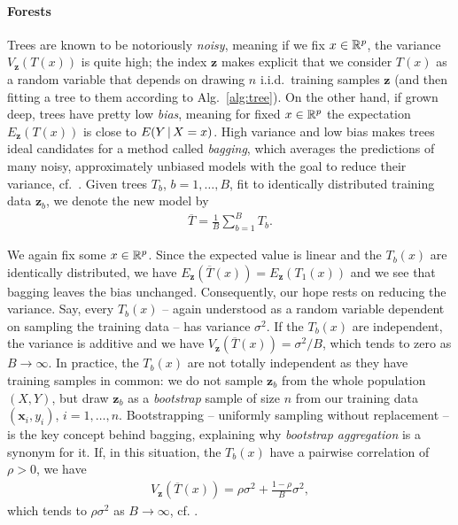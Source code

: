 \paragraph{Forests}
Trees are known to be notoriously \textit{noisy}, meaning if we fix $x \in \mathbb{R}^p$, the variance 
$V_\mathbf{z}(T(x))$ is quite high; the index $\mathbf{z}$ makes explicit that we consider $T(x)$ as 
a random variable that depends on drawing $n$ i.i.d.\ training samples $\mathbf{z}$ (and 
then fitting a tree to them according to Alg.\ \ref{alg:tree}). On the other hand, if grown deep,
trees have pretty low \textit{bias}, meaning for fixed $x \in \mathbb{R}^p$ the expectation $E_\mathbf{z}(T(x))$ 
is close to $E(Y \,|\, X = x)$. High variance and low bias makes trees 
ideal candidates for a method called \textit{bagging}, which averages the predictions of many noisy, 
approximately unbiased models with the goal to reduce their variance, cf.\ \cite{breiman96}. Given 
trees $T_b$, $b = 1, 
\ldots, B$, fit to identically distributed training data $\mathbf{z}_b$, we denote the new model 
by 
\begin{align}
    \overline{T} = \frac{1}{B} \sum_{b=1}^B T_b.
\end{align}

We again fix some $x \in \mathbb{R}^p$. Since the expected value is linear and the $T_b(x)$ are identically 
distributed, we have $E_\mathbf{z}(\overline{T}(x)) = E_\mathbf{z}(T_1(x))$ and we see that bagging 
leaves the bias unchanged. Consequently, our hope rests on reducing the variance. Say, every 
$T_b(x)$ -- again understood as a random variable dependent on sampling the training data -- has 
variance $\sigma^2$. If the $T_b(x)$ are independent, the variance is additive and we have 
$V_\mathbf{z}(\overline{T}(x)) = \sigma^2/B$, which tends to zero as $B \to \infty$. In practice, 
the $T_b(x)$ are not totally independent as they have training samples in common: we do not 
sample $\mathbf{z}_b$ from the whole population $(X, Y)$, but draw $\mathbf{z}_b$ as a 
\textit{bootstrap} sample of size $n$ from our training 
data $(\mathbf{x}_i, y_i)$, $i = 1, \ldots, n$. Bootstrapping -- uniformly sampling without 
replacement -- is the key concept behind bagging, 
explaining why \textit{bootstrap aggregation} is a synonym for it. If, in this situation, the 
$T_b(x)$ have a pairwise correlation of $\rho > 0$, we have 
\begin{align}
    V_\mathbf{z}\left(\overline{T}(x)\right) = \rho \sigma^2 + \frac{1-\rho}{B} \sigma^2,
\end{align}
which tends to $\rho \sigma^2$ as $B \to \infty$, cf. \cite[Eq. (15.1)]{elem-stat-learn01}.

